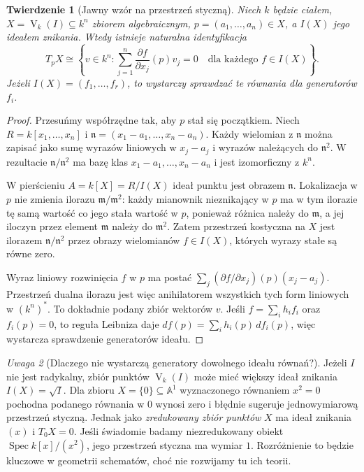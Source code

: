 \documentclass[11pt,a4paper,openany]{report}
\numberwithin{equation}{section}
\theoremstyle{plain}
\newtheorem{twierdzenie}{Twierdzenie}[section]
\theoremstyle{definition}
\theoremstyle{remark}
\newtheorem{uwaga}[twierdzenie]{Uwaga}
\newcommand{\A}{\mathbb A}
\newcommand{\V}{\operatorname V}
\begin{document}
\begin{twierdzenie}[Jawny wzór na przestrzeń styczną]
\label{tw:zariski-tangent-formula}
Niech $k$ będzie ciałem, $X=\V_k(I)\subseteq k^n$
zbiorem algebraicznym, $p=(a_1,\dots,a_n)\in X$,
a $I(X)$ jego ideałem znikania. Wtedy istnieje
naturalna identyfikacja
\[
 T_pX\cong\left\{v\in k^n:
 \sum_{j=1}^n\frac{\partial f}{\partial x_j}(p)v_j=0
 \quad\text{dla każdego }f\in I(X)\right\}.
\]
Jeżeli $I(X)=(f_1,\dots,f_r)$, to wystarczy sprawdzać
te równania dla generatorów $f_i$.
\end{twierdzenie}
\begin{proof}
Przesuńmy współrzędne tak, aby $p$ stał się początkiem.
Niech $R=k[x_1,\dots,x_n]$ i
$\mathfrak n=(x_1-a_1,\dots,x_n-a_n)$.
Każdy wielomian z $\mathfrak n$ można zapisać jako
sumę wyrazów liniowych w $x_j-a_j$ i wyrazów należących
do $\mathfrak n^2$. W rezultacie
$\mathfrak n/\mathfrak n^2$ ma bazę klas
$x_1-a_1,\dots,x_n-a_n$ i jest izomorficzny z $k^n$.

W pierścieniu $A=k[X]=R/I(X)$ ideał punktu jest obrazem
$\mathfrak n$. Lokalizacja w $p$ nie zmienia ilorazu
$\mathfrak m/\mathfrak m^2$: każdy mianownik nieznikający
w $p$ ma w tym ilorazie tę samą wartość co jego stała
wartość w $p$, ponieważ różnica należy do $\mathfrak m$,
a jej iloczyn przez element $\mathfrak m$ należy do
$\mathfrak m^2$. Zatem przestrzeń kostyczna na $X$
jest ilorazem $\mathfrak n/\mathfrak n^2$ przez obrazy
wielomianów $f\in I(X)$, których wyrazy stałe są równe zero.

Wyraz liniowy rozwinięcia $f$ w $p$ ma postać
$\sum_j(\partial f/\partial x_j)(p)(x_j-a_j)$.
Przestrzeń dualna ilorazu jest więc anihilatorem
wszystkich tych form liniowych w $(k^n)^*$.
To dokładnie podany zbiór wektorów $v$.
Jeśli $f=\sum_i h_if_i$ oraz $f_i(p)=0$, to
reguła Leibniza daje
$df(p)=\sum_i h_i(p)\,df_i(p)$, więc wystarcza
sprawdzenie generatorów ideału.
\end{proof}

\begin{uwaga}[Dlaczego nie wystarczą generatory dowolnego ideału równań?]
Jeżeli $I$ nie jest radykalny, zbiór punktów $\V_k(I)$
może mieć większy ideał znikania $I(X)=\sqrt I$.
Dla zbioru $X=\{0\}\subseteq\A^1$ wyznaczonego
równaniem $x^2=0$ pochodna podanego równania w $0$
wynosi zero i błędnie sugeruje jednowymiarową przestrzeń
styczną. Jednak jako \emph{zredukowany zbiór punktów}
$X$ ma ideał znikania $(x)$ i $T_0X=0$.
Jeśli świadomie badamy niezredukowany obiekt
$\operatorname{Spec}k[x]/(x^2)$, jego przestrzeń
styczna ma wymiar $1$. Rozróżnienie to będzie kluczowe
w geometrii schematów, choć nie rozwijamy tu ich teorii.
\end{uwaga}
\end{document}
